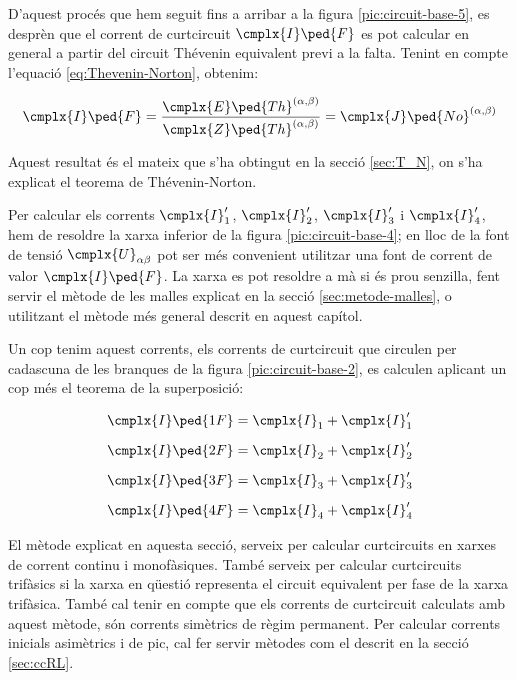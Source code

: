 D'aquest procés que hem seguit fins a arribar a la figura \vref{pic:circuit-base-5}, es desprèn que el corrent de curtcircuit $\cmplx{I}\ped{F}$ es pot calcular en general a partir del circuit Thévenin equivalent previ a la falta. Tenint en compte l'equació \eqref{eq:Thevenin-Norton}, obtenim:

\begin{equation}
	\cmplx{I}\ped{F} = \frac{\cmplx{E}\ped{Th}^{(\alpha, \beta)}}{\cmplx{Z}\ped{Th}^{(\alpha, \beta)}}
	= \cmplx{J}\ped{No}^{(\alpha, \beta)}
\end{equation}

Aquest resultat és el mateix que s'ha obtingut en la secció \ref{sec:T_N}, on s'ha explicat el teorema de Thévenin-Norton.

Per calcular els corrents $\cmplx{I}_1'$, $\cmplx{I}_2'$, $\cmplx{I}_3'$ i $\cmplx{I}_4'$, hem de resoldre la xarxa inferior de la figura \vref{pic:circuit-base-4}; en lloc de la font de tensió $\cmplx{U}_{\alpha\beta}$ pot ser més convenient utilitzar una font de corrent de valor $\cmplx{I}\ped{F}$. La xarxa es pot resoldre a mà si és prou senzilla, fent servir el mètode de les malles explicat en la secció \vref{sec:metode-malles}, o utilitzant el mètode més general descrit en aquest capítol.

Un cop tenim aquest corrents, els corrents de curtcircuit que circulen per cadascuna de les branques de la figura \vref{pic:circuit-base-2}, es calculen  aplicant un cop més el teorema de la superposició:

\begin{subequations}
\begin{align}
	\cmplx{I}\ped{1F} &= \cmplx{I}_1 + \cmplx{I}_1' \\[0.5em]
	\cmplx{I}\ped{2F} &= \cmplx{I}_2 + \cmplx{I}_2' \\[0.5em]
	\cmplx{I}\ped{3F} &= \cmplx{I}_3 + \cmplx{I}_3' \\[0.5em]
	\cmplx{I}\ped{4F} &= \cmplx{I}_4 + \cmplx{I}_4' 
\end{align}
\end{subequations}
	
El mètode  explicat en aquesta secció, serveix per calcular curtcircuits en xarxes de corrent continu i monofàsiques. També serveix per calcular curtcircuits trifàsics si la xarxa en qüestió representa el circuit equivalent per fase de la xarxa trifàsica. També cal tenir en compte que els corrents de curtcircuit calculats amb aquest mètode, són corrents simètrics de règim permanent. Per calcular corrents inicials asimètrics i de pic, cal fer servir mètodes com el descrit en la secció \vref{sec:ccRL}.


